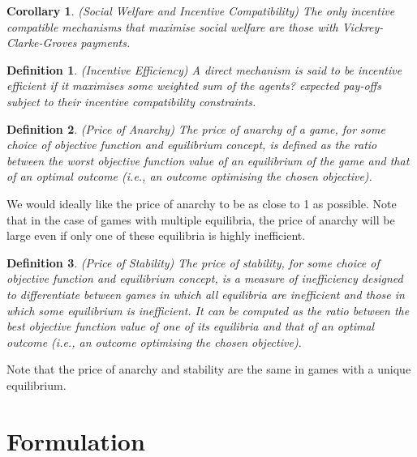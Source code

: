 \documentclass{article}
\newtheorem{definition}{Definition}
\newtheorem{corollary}{Corollary}
\begin{document}
\begin{corollary}
(Social Welfare and Incentive Compatibility) The only incentive compatible mechanisms that maximise social welfare are those with Vickrey-Clarke-Groves payments.
\end{corollary}

\begin{definition}
(Incentive Efficiency) A direct mechanism is said to be incentive efficient if it maximises some weighted sum of the agents? expected pay-offs subject to their incentive compatibility constraints.
\end{definition}

\begin{definition}
(Price of Anarchy) The price of anarchy of a game, for some choice of objective function and equilibrium concept, is defined as the ratio between the worst objective function value of an equilibrium of the game and that of an optimal outcome (i.e., an outcome optimising the chosen objective).
\end{definition}

We would ideally like the price of anarchy to be as close to 1 as possible. Note that in the case of games with multiple equilibria, the price of anarchy will be large even if only one of these equilibria is highly inefficient. 

\begin{definition}
(Price of Stability) The price of stability, for some choice of objective function and equilibrium concept, is a measure of inefficiency designed to differentiate between games in which all equilibria are inefficient and those in which some equilibrium is inefficient. It can be computed as the ratio between the best objective function value of one of its equilibria and that of an optimal outcome (i.e., an outcome optimising the chosen objective).
\end{definition}

Note that the price of anarchy and stability are the same in games with a unique equilibrium.

\section{Formulation}
\end{document}
